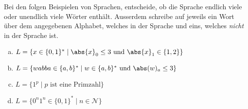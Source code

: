 %
%
Bei den folgen Beispielen von Sprachen, entscheide, ob die Sprache endlich viele oder unendlich viele Wörter enthält. Ausserdem schreibe auf jeweils ein Wort über dem angegebenen Alphabet, welches in der Sprache und eins, welches \emph{nicht} in der Sprache ist.

{
\begin{enumerate}[(a)]
    \item \(L = \{x \in \{0,1\}^* \mid \abs{x}_0 \leq 3 \text{ und } \abs{x}_1 \in \{1,2\}\}\) \\
    \blank[width=\linewidth]{}

    \item \(L = \{wabba \in \{a,b\}^* \mid w \in \{a, b\}^* \text{ und } \abs(w)_a \leq 3\}\) \\
    \blank[width=\linewidth]{}

    \item \(L = \{1^p \mid p \text{ ist eine Primzahl}\}\) \\
    \blank[width=\linewidth]{}

    \item \(L = \{0^n 1^n \in \{0, 1\}^* \mid n \in \mathcal{N}\}\) \\
    \blank[width=\linewidth]{}
\end{enumerate}
}
